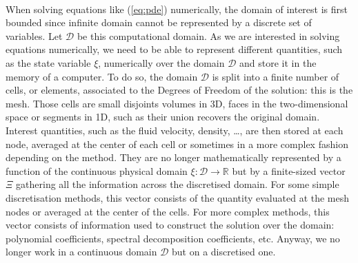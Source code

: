     \paragraph{}
    When solving equations like (\ref{eq:pde}) numerically, the domain of interest is first bounded since infinite domain cannot be represented by a discrete set of variables.
    Let $\mathcal{D}$ be this computational domain.
    As we are interested in solving equations numerically, we need to be able to represent different quantities, such as the state variable $\xi$, numerically over the domain $\mathcal{D}$ and store it in the memory of a computer.
    To do so, the domain $\mathcal{D}$ is split into a finite number of cells, or elements, associated to the Degrees of Freedom of the solution: this is the mesh.
    Those cells are small disjoints volumes in 3D, faces in the two-dimensional space or segments in 1D, such as their union recovers the original domain.
    Interest quantities, such as the fluid velocity, density, \dots, are then stored at each node, averaged at the center of each cell or sometimes in a more complex fashion depending on the method.
    They are no longer mathematically represented by a function of the continuous physical domain $\xi: \mathcal{D} \rightarrow \mathbb{R}$ but by a finite-sized vector $\Xi$ gathering all the information across the discretised domain.
    For some simple discretisation methods, this vector consists of the quantity evaluated at the mesh nodes or averaged at the center of the cells.
    For more complex methods, this vector consists of information used to construct the solution over the domain: polynomial coefficients, spectral decomposition coefficients, etc.
    Anyway, we no longer work in a continuous domain $\mathcal{D}$ but on a discretised one.

